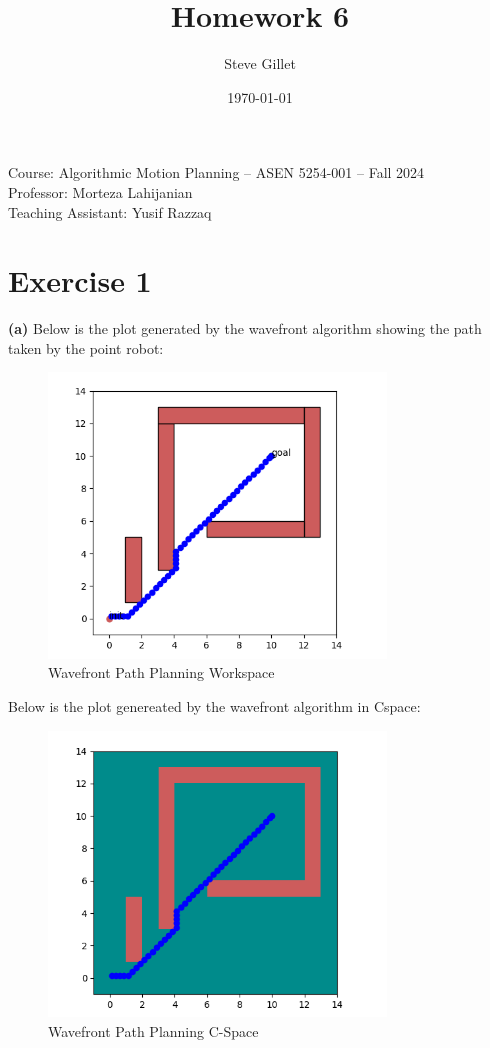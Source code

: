 \documentclass{article}
\title{Homework 6}
\author{Steve Gillet}
\date{\today}
\newcommand{\className}{Course: Algorithmic Motion Planning – ASEN 5254-001 – Fall 2024}
\newcommand{\professorName}{Professor: Morteza Lahijanian}
\newcommand{\taName}{Teaching Assistant: Yusif Razzaq}
\begin{document}
\maketitle
\begin{center}
    \large{\className} \\
    \large{\professorName} \\
    \large{\taName}
\end{center}

\section{Exercise 1}

\textbf{(a)} Below is the plot generated by the wavefront algorithm showing the path taken by the point robot:

\begin{figure}[h]
    \centering
    \includegraphics[width=0.8\textwidth]{pointWaveWorkspace.png}
    \caption{Wavefront Path Planning Workspace}
    \label{fig:wavefrontWork}
\end{figure}

Below is the plot genereated by the wavefront algorithm in Cspace:

\begin{figure}[h]
    \centering
    \includegraphics[width=0.8\textwidth]{pointWaveCspace.png}
    \caption{Wavefront Path Planning C-Space}
    \label{fig:wavefrontCspace}
\end{figure}
\end{document}
